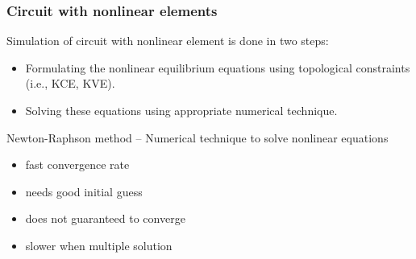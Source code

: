 \documentclass{beamer}
\begin{document}
\begin{frame}
\frametitle{Circuit with nonlinear elements}
Simulation of circuit with nonlinear element is done in two steps:
\begin{itemize}
\item Formulating the nonlinear equilibrium equations using topological constraints (i.e., KCE, KVE).
\item Solving these equations using appropriate numerical technique.
\end{itemize} 
Newton-Raphson method -- Numerical technique to solve nonlinear equations
\begin{itemize}
\item fast convergence rate
\item needs good initial guess
\item does not guaranteed to converge
\item slower when multiple solution
\end{itemize}
\end{frame}
\end{document}
